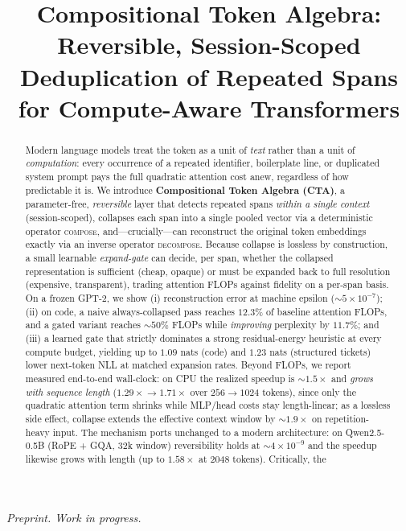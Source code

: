 \documentclass[11pt]{article}
\title{\textbf{Compositional Token Algebra: Reversible, Session-Scoped\\
Deduplication of Repeated Spans for Compute-Aware Transformers}}
\author{}
\date{}
\newcommand{\compose}{\textsc{compose}}
\newcommand{\decompose}{\textsc{decompose}}
\begin{document}
\maketitle
\vspace{-2.5em}
\begin{center}
\textit{Preprint. Work in progress.}
\end{center}
\vspace{1em}

\begin{abstract}
Modern language models treat the token as a unit of \emph{text} rather than a unit of
\emph{computation}: every occurrence of a repeated identifier, boilerplate line, or
duplicated system prompt pays the full quadratic attention cost anew, regardless of how
predictable it is. We introduce \textbf{Compositional Token Algebra (CTA)}, a
parameter-free, \emph{reversible} layer that detects repeated spans \emph{within a single
context} (session-scoped), collapses each span into a single pooled vector via a
deterministic operator \compose, and---crucially---can reconstruct the original token
embeddings exactly via an inverse operator \decompose. Because collapse is lossless by
construction, a small learnable \emph{expand-gate} can decide, per span, whether the
collapsed representation is sufficient (cheap, opaque) or must be expanded back to full
resolution (expensive, transparent), trading attention FLOPs against fidelity on a
per-span basis. On a frozen GPT-2, we show (i) reconstruction error at machine epsilon
($\sim\!5\times10^{-7}$); (ii) on code, a naive always-collapsed pass reaches $12.3\%$ of
baseline attention FLOPs, and a gated variant reaches $\sim\!50\%$ FLOPs while
\emph{improving} perplexity by $11.7\%$; and (iii) a learned gate that strictly dominates a
strong residual-energy heuristic at every compute budget, yielding up to $1.09$ nats
(code) and $1.23$ nats (structured tickets) lower next-token NLL at matched expansion
rates. Beyond FLOPs, we report measured end-to-end wall-clock: on CPU the realized
speedup is ${\sim}1.5\times$ and \emph{grows with sequence length}
($1.29\times\!\to\!1.71\times$ over $256\!\to\!1024$ tokens), since only the quadratic
attention term shrinks while MLP/head costs stay length-linear; as a lossless side
effect, collapse extends the effective context window by ${\sim}1.9\times$ on
repetition-heavy input. The mechanism ports unchanged to a modern architecture: on
Qwen2.5-0.5B (RoPE + GQA, 32k window) reversibility holds at ${\sim}4\times10^{-9}$ and the
speedup likewise grows with length (up to $1.58\times$ at 2048 tokens). Critically, the

\end{abstract}
\end{document}
